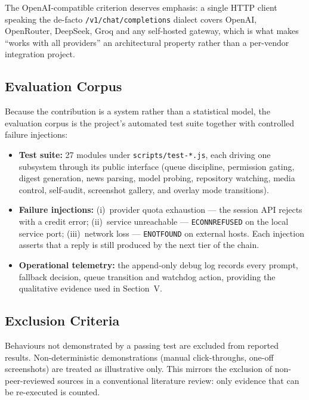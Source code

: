 The OpenAI-compatible criterion deserves emphasis: a single
HTTP client speaking the de-facto \texttt{/v1/chat/completions}
dialect covers OpenAI, OpenRouter, DeepSeek, Groq and any
self-hosted gateway, which is what makes ``works with all
providers'' an architectural property rather than a per-vendor
integration project.

\subsection{Evaluation Corpus}

Because the contribution is a system rather than a statistical
model, the evaluation corpus is the project's automated test
suite together with controlled failure injections:

\begin{itemize}
  \item \textbf{Test suite:} 27 modules under
  \texttt{scripts/test-*.js}, each driving one subsystem through
  its public interface (queue discipline, permission gating,
  digest generation, news parsing, model probing, repository
  watching, media control, self-audit, screenshot gallery, and
  overlay mode transitions).
  \item \textbf{Failure injections:} (i)~provider quota
  exhaustion --- the session API rejects with a credit error;
  (ii)~service unreachable --- \texttt{ECONNREFUSED} on the local
  service port; (iii)~network loss --- \texttt{ENOTFOUND} on
  external hosts. Each injection asserts that a reply is still
  produced by the next tier of the chain.
  \item \textbf{Operational telemetry:} the append-only debug log
  records every prompt, fallback decision, queue transition and
  watchdog action, providing the qualitative evidence used in
  Section~V.
\end{itemize}

\subsection{Exclusion Criteria}

Behaviours not demonstrated by a passing test are excluded from
reported results. Non-deterministic demonstrations (manual
click-throughs, one-off screenshots) are treated as illustrative
only. This mirrors the exclusion of non-peer-reviewed sources in
a conventional literature review: only evidence that can be
re-executed is counted.


